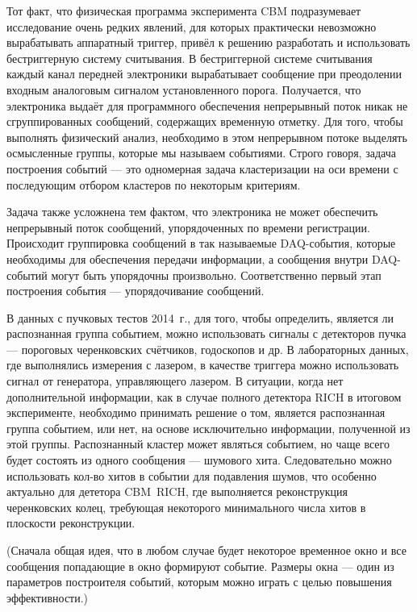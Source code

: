 Тот факт, что физическая программа эксперимента CBM подразумевает исследование очень редких явлений, для которых практически невозможно вырабатывать аппаратный триггер, привёл к решению разработать и использовать бестриггерную систему считывания. В бестриггерной системе считывания каждый канал передней электроники вырабатывает сообщение при преодолении входным аналоговым сигналом установленного порога. Получается, что электроника выдаёт для программного обеспечения непрерывный поток никак не сгруппированных сообщений, содержащих временную отметку. Для того, чтобы выполнять физический анализ, необходимо в этом непрерывном потоке выделять осмысленные группы, которые мы называем событиями. Строго говоря, задача построения событий --- это одномерная задача кластеризации на оси времени с последующим отбором кластеров по некоторым критериям.

Задача также усложнена тем фактом, что электроника не может обеспечить непрерывный поток сообщений, упорядоченных по времени регистрации. Происходит группировка сообщений в так называемые DAQ-события, которые необходимы для обеспечения передачи информации, а сообщения внутри DAQ-событий могут быть упорядочны произвольно. Соответственно первый этап построения события --- упорядочивание сообщений.

В данных с пучковых тестов 2014~г., для того, чтобы определить, является ли распознанная группа событием, можно использовать сигналы с детекторов пучка --- пороговых черенковских счётчиков, годоскопов и др. В лабораторных данных, где выполнялись измерения с лазером, в качестве триггера можно использовать сигнал от генератора, управляющего лазером. В ситуации, когда нет дополнительной информации, как в случае полного детектора RICH в итоговом эксперименте, необходимо принимать решение о том, является распознанная группа событием, или нет, на основе исключительно информации, полученной из этой группы. Распознанный кластер может являться событием, но чаще всего будет состоять из одного сообщения --- шумового хита. Следовательно можно использовать кол-во хитов в событии для подавления шумов, что особенно актуально для дететора CBM~RICH, где выполняется реконструкция черенковских колец, требующая некоторого минимального числа хитов в плоскости реконструкции.

(Сначала общая идея, что в любом случае будет некоторое временное окно и все сообщения попадающие в окно формируют событие. Размеры окна --- один из параметров построителя событий, которым можно играть с целью повышения эффективности.)

